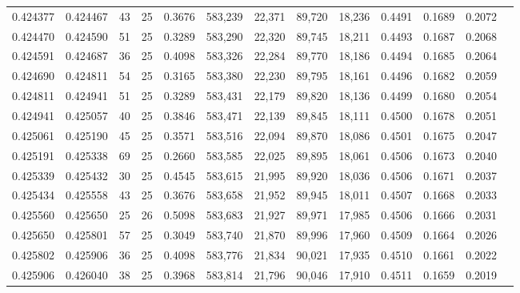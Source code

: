 \begin{tabular}{rrrrrrrrrrrrr}
0.424377 & 0.424467 &    43 &  25 &                                     0.3676 & 583,239 &  22,371 &  89,720 &  18,236 & 0.4491 & 0.1689 & 0.2072 \\
0.424470 & 0.424590 &    51 &  25 &                                     0.3289 & 583,290 &  22,320 &  89,745 &  18,211 & 0.4493 & 0.1687 & 0.2068 \\
0.424591 & 0.424687 &    36 &  25 &                                     0.4098 & 583,326 &  22,284 &  89,770 &  18,186 & 0.4494 & 0.1685 & 0.2064 \\
0.424690 & 0.424811 &    54 &  25 &                                     0.3165 & 583,380 &  22,230 &  89,795 &  18,161 & 0.4496 & 0.1682 & 0.2059 \\
0.424811 & 0.424941 &    51 &  25 &                                     0.3289 & 583,431 &  22,179 &  89,820 &  18,136 & 0.4499 & 0.1680 & 0.2054 \\
0.424941 & 0.425057 &    40 &  25 &                                     0.3846 & 583,471 &  22,139 &  89,845 &  18,111 & 0.4500 & 0.1678 & 0.2051 \\
0.425061 & 0.425190 &    45 &  25 &                                     0.3571 & 583,516 &  22,094 &  89,870 &  18,086 & 0.4501 & 0.1675 & 0.2047 \\
0.425191 & 0.425338 &    69 &  25 &                                     0.2660 & 583,585 &  22,025 &  89,895 &  18,061 & 0.4506 & 0.1673 & 0.2040 \\
0.425339 & 0.425432 &    30 &  25 &                                     0.4545 & 583,615 &  21,995 &  89,920 &  18,036 & 0.4506 & 0.1671 & 0.2037 \\
0.425434 & 0.425558 &    43 &  25 &                                     0.3676 & 583,658 &  21,952 &  89,945 &  18,011 & 0.4507 & 0.1668 & 0.2033 \\
0.425560 & 0.425650 &    25 &  26 &                                     0.5098 & 583,683 &  21,927 &  89,971 &  17,985 & 0.4506 & 0.1666 & 0.2031 \\
0.425650 & 0.425801 &    57 &  25 &                                     0.3049 & 583,740 &  21,870 &  89,996 &  17,960 & 0.4509 & 0.1664 & 0.2026 \\
0.425802 & 0.425906 &    36 &  25 &                                     0.4098 & 583,776 &  21,834 &  90,021 &  17,935 & 0.4510 & 0.1661 & 0.2022 \\
0.425906 & 0.426040 &    38 &  25 &                                     0.3968 & 583,814 &  21,796 &  90,046 &  17,910 & 0.4511 & 0.1659 & 0.2019 \\

\end{tabular}
